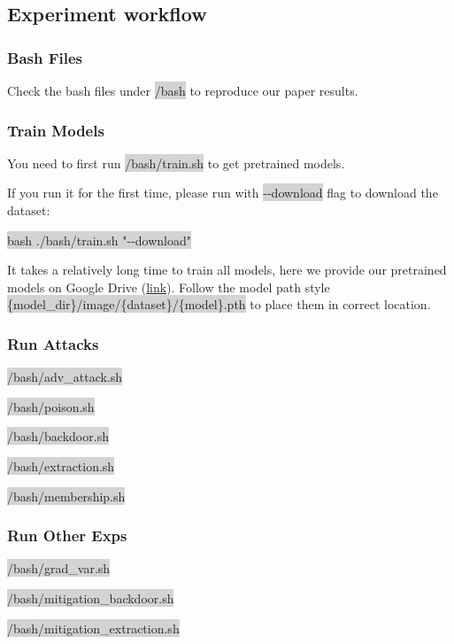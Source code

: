 \documentclass[letterpaper,twocolumn,10pt]{article}
\begin{document}
{{{{%
\subsection{Experiment workflow}
\subsubsection*{Bash Files}
Check the bash files under \colorbox{lightgray}{/bash} to reproduce our paper results.
\subsubsection*{Train Models}
You need to first run \colorbox{lightgray}{/bash/train.sh} to get pretrained models.

If you run it for the first time, please run with \colorbox{lightgray}{-{}-download} flag to download the dataset:

\colorbox{lightgray}{bash ./bash/train.sh "-{}-download"}

It takes a relatively long time to train all models, here we provide our pretrained models on Google Drive (\href{https://drive.google.com/drive/folders/1GrjEO89hYrdLhDMkBLC26jp1C7BwIKwm?usp=sharing}{link}). Follow the model path style \colorbox{lightgray}{\{model\_dir\}/image/\{dataset\}/\{model\}.pth} to place them in correct location.

\subsubsection*{Run Attacks}
\noindent
\colorbox{lightgray}{/bash/adv\_attack.sh}

\noindent
\colorbox{lightgray}{/bash/poison.sh}

\noindent
\colorbox{lightgray}{/bash/backdoor.sh}

\noindent
\colorbox{lightgray}{/bash/extraction.sh}

\noindent
\colorbox{lightgray}{/bash/membership.sh}

\subsubsection*{Run Other Exps}
\noindent
\colorbox{lightgray}{/bash/grad\_var.sh}

\noindent
\colorbox{lightgray}{/bash/mitigation\_backdoor.sh}

\noindent
\colorbox{lightgray}{/bash/mitigation\_extraction.sh}

}}}}
\end{document}
